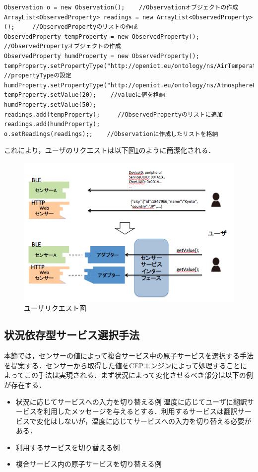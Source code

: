 \documentclass{kuisthesis}			%
\begin{document}
\begin{lstlisting}[caption=Observation生成例,label=observationimpl]
Observation o = new Observation();    //Observationオブジェクトの作成
ArrayList<ObservedProperty> readings = new ArrayList<ObservedProperty>();     //ObservedPropertyのリストの作成
ObservedProperty tempProperty = new ObservedProperty();    //ObservedPropertyオブジェクトの作成
ObservedProperty humdProperty = new ObservedProperty();    
tempProperty.setPropertyType("http://openiot.eu/ontology/ns/AirTemperature");    　//propertyTypeの設定
humdProperty.setPropertyType("http://openiot.eu/ontology/ns/AtmosphereHumidity");
tempProperty.setValue(20);    //valueに値を格納
humdProperty.setValue(50);
readings.add(tempProperty);     //ObservedPropertyのリストに追加
readings.add(humdProperty);
o.setReadings(readings);;    //Observationに作成したリストを格納
\end{lstlisting}

これにより，ユーザのリクエストは以下図\ref{service}のように簡潔化される．

\begin{figure}
 \begin{center}
  \includegraphics[width=\linewidth]{pic/service.png}
  \caption{ユーザリクエスト図}
 \end{center}
 \label{service}
\end{figure}


\subsection{状況依存型サービス選択手法}
本節では，センサーの値によって複合サービス中の原子サービスを選択する手法を提案する．センサーから取得した値をCEPエンジンによって処理することによってこの手法は実現される．まず状況によって変化させるべき部分は以下の例が存在する．
\begin{itemize}
\item 状況に応じてサービスへの入力を切り替える例
温度に応じてユーザに翻訳サービスを利用したメッセージを与えるとする．利用するサービスは翻訳サービスで変化はしないが，温度に応じてサービスへの入力を切り替える必要がある．
\item 利用するサービスを切り替える例
\item 複合サービス内の原子サービスを切り替える例
\end{itemize}
\end{document}
